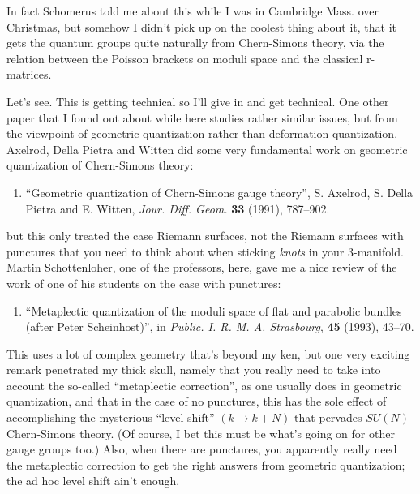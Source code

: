 \documentclass{article}
\def\tightlist{}
\begin{document}
In fact Schomerus told me about this while I was in Cambridge Mass. over
Christmas, but somehow I didn't pick up on the coolest thing about it,
that it gets the quantum groups quite naturally from Chern-Simons
theory, via the relation between the Poisson brackets on moduli space
and the classical r-matrices.

Let's see. This is getting technical so I'll give in and get technical.
One other paper that I found out about while here studies rather similar
issues, but from the viewpoint of geometric quantization rather than
deformation quantization. Axelrod, Della Pietra and Witten did some very
fundamental work on geometric quantization of Chern-Simons theory:

\begin{enumerate}
\def\labelenumi{\arabic{enumi})}
\setcounter{enumi}{5}
\tightlist
\item
  ``Geometric quantization of Chern-Simons gauge theory'', S. Axelrod,
  S. Della Pietra and E. Witten, \emph{Jour. Diff. Geom.} \textbf{33}
  (1991), 787--902.
\end{enumerate}

but this only treated the case Riemann surfaces, not the Riemann
surfaces with punctures that you need to think about when sticking
\emph{knots} in your 3-manifold. Martin Schottenloher, one of the
professors, here, gave me a nice review of the work of one of his
students on the case with punctures:

\begin{enumerate}
\def\labelenumi{\arabic{enumi})}
\setcounter{enumi}{6}
\tightlist
\item
  ``Metaplectic quantization of the moduli space of flat and parabolic
  bundles (after Peter Scheinhost)'', in \emph{Public. I. R. M. A.
  Strasbourg}, \textbf{45} (1993), 43--70.
\end{enumerate}

This uses a lot of complex geometry that's beyond my ken, but one very
exciting remark penetrated my thick skull, namely that you really need
to take into account the so-called ``metaplectic correction'', as one
usually does in geometric quantization, and that in the case of no
punctures, this has the sole effect of accomplishing the mysterious
``level shift'' \((k \to k + N)\) that pervades \(SU(N)\) Chern-Simons
theory. (Of course, I bet this must be what's going on for other gauge
groups too.) Also, when there are punctures, you apparently really need
the metaplectic correction to get the right answers from geometric
quantization; the ad hoc level shift ain't enough.
\end{document}
